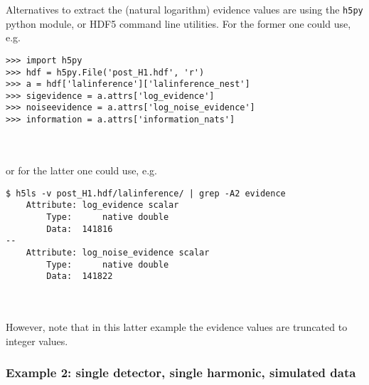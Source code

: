 Alternatives to extract the (natural logarithm) evidence values are using the {\tt h5py} python module, or HDF5 command line utilities. For the former one could
use, e.g.\
\begin{lrbox}{\Lst}
\begin{lstlisting}
>>> import h5py
>>> hdf = h5py.File('post_H1.hdf', 'r')
>>> a = hdf['lalinference']['lalinference_nest']
>>> sigevidence = a.attrs['log_evidence']
>>> noiseevidence = a.attrs['log_noise_evidence']
>>> information = a.attrs['information_nats']
\end{lstlisting}
\end{lrbox}
\\[5pt] \indent \fbox{\usebox{\Lst}} \\[5pt]
or for the latter one could use, e.g.\
\begin{lrbox}{\Lst}
\begin{lstlisting}
$ h5ls -v post_H1.hdf/lalinference/ | grep -A2 evidence
    Attribute: log_evidence scalar
        Type:      native double
        Data:  141816
--
    Attribute: log_noise_evidence scalar
        Type:      native double
        Data:  141822
\end{lstlisting}
\end{lrbox}
\\[5pt] \indent \fbox{\usebox{\Lst}} \\[5pt]
However, note that in this latter example the evidence values are truncated to integer values.

\subsubsection{Example 2: single detector, single harmonic, simulated data}

